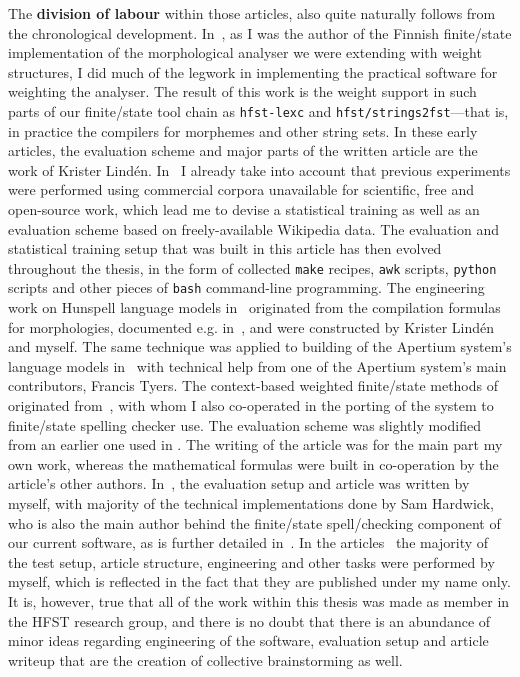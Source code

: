 \documentclass[officiallayout]{unihelcompling}
\begin{document}
The \textbf{division of labour} within those articles, also quite naturally
follows from the chronological development.
In~, as I was the author
of the Finnish finite\-/state implementation of the morphological analyser we
were extending with weight structures, I did much of the legwork in
implementing the practical software for weighting the analyser. The result of
this work is the weight support in such parts of our finite\-/state tool chain
as \texttt{hfst-lexc} and \texttt{hfst\-/strings2fst}---that is, in practice
the compilers for morphemes and other string sets. In these early articles, the
evaluation scheme and major parts of the written article are the work of
Krister Lindén.  In~ I already take into
account that previous experiments were performed using commercial corpora
unavailable for scientific, free and open-source work, which lead me to devise
a statistical training as well as an evaluation scheme based on
freely-available Wikipedia data. The evaluation and statistical training setup
that was built in this article has then evolved throughout the thesis, in the
form of collected \texttt{make} recipes, \texttt{awk} scripts, \texttt{python}
scripts and other pieces of \texttt{bash} command-line programming. The
engineering work on Hunspell language models
in~ originated from the
compilation formulas for morphologies, documented e.g.\/
in~\cite{linden2009hfst}, and were constructed by Krister Lindén and myself.
The same technique was applied to building of the Apertium system's language
models in~ with technical help from one of the
Apertium system's main contributors, Francis Tyers.  The context-based weighted
finite\-/state methods of  originated
from~\citet{silfverberg2010partofspeech}, with whom I also co-operated in the
porting of the system to finite\-/state spelling checker use. The evaluation
scheme was slightly modified from an earlier one used in
. The writing of the article
 was for the main part  my own work, whereas
the mathematical formulas were built in co-operation by the article's other
authors.  In~, the evaluation setup and article
was written by myself, with majority of the technical implementations done by
Sam Hardwick, who is also the main author behind the finite\-/state
spell\-/checking component of our current software, as is further detailed
in~\citet{linden2011hfst}.  In the
articles~ the majority
of the test setup, article structure, engineering and other tasks were
performed by myself, which is reflected in the fact that they are published
under my name only. It is, however, true that all of the work within this
thesis was made as member in the HFST research group, and there is no doubt
that there is an abundance of minor ideas regarding engineering of the
software, evaluation setup and article writeup that are the creation of
collective brainstorming as well.
\end{document}
